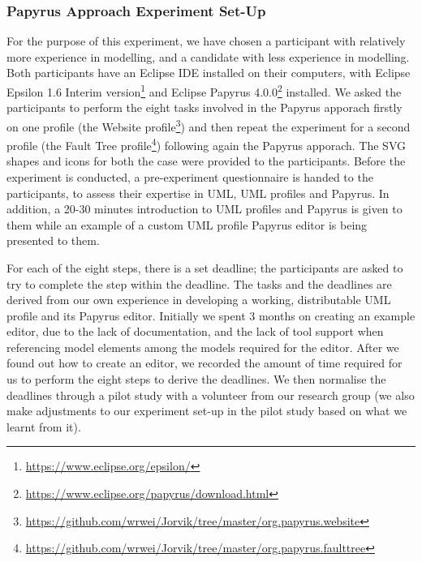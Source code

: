 \subsubsection{Papyrus Approach Experiment Set-Up}
For the purpose of this experiment, we have chosen a participant with relatively more experience in modelling, and a candidate with less experience in modelling. 
Both participants have an Eclipse IDE installed on their computers, with Eclipse Epsilon 1.6 Interim version\footnote{\url{https://www.eclipse.org/epsilon/}} and Eclipse Papyrus 4.0.0\footnote{\url{https://www.eclipse.org/papyrus/download.html}} installed.
We asked the participants to perform the eight tasks involved in the Papyrus apporach firstly on one profile (the Website profile\footnote{\url{https://github.com/wrwei/Jorvik/tree/master/org.papyrus.website}}) and then repeat the experiment for a second profile (the Fault Tree profile\footnote{\url{https://github.com/wrwei/Jorvik/tree/master/org.papyrus.faulttree}}) following again the Papyrus apporach. 
The SVG shapes and icons for both the case were provided to the participants. 
Before the experiment is conducted, a pre-experiment questionnaire is handed to the participants, to assess their expertise in UML, UML profiles and Papyrus. 
In addition, a 20-30 minutes introduction to UML profiles and Papyrus is given to them while an example of a custom UML profile Papyrus editor is being presented to them. 

For each of the eight steps, there is a set deadline; the participants are asked to try to complete the step within the deadline.
The tasks and the deadlines are derived from our own experience in developing a working, distributable UML profile and its Papyrus editor. 
Initially we spent 3 months on creating an example editor, due to the lack of documentation, and the lack of tool support when referencing model elements among the models required for the editor.
After we found out how to create an editor, we recorded the amount of time required for us to perform the eight steps to derive the deadlines. 
We then normalise the deadlines through a pilot study with a volunteer from our research group (we also make adjustments to our experiment set-up in the pilot study based on what we learnt from it). 


